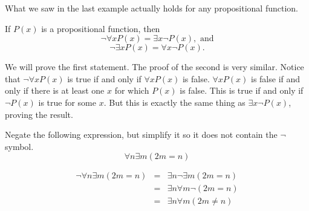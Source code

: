 What we saw in the last example actually holds for any propositional function. 
 
\begin{thm}
If $P(x)$ is a propositional function, then
$$\neg\forall x P(x) = \exists x \neg P(x), \mbox{ and}$$
$$\neg\exists x P(x) = \forall x \neg P(x).$$
\begin{pf}
We will prove the first statement.  The proof of the second is very similar.
Notice that $\neg\forall x P(x)$ is true if and only if $\forall x P(x)$ is false.
$\forall x P(x)$ is false if and only if there is at least one $x$ for which $P(x)$ is false.
This is true if and only if $\neg P(x)$ is true for some $x$.
But this is exactly the same thing as $\exists x \neg P(x)$, proving the result.
\end{pf}
\end{thm}



\begin{exa}\label{exa:allIntsEven}
Negate the following expression, but simplify it so it does not contain the $\neg$ symbol.
$$
\forall n \exists m (2m=n)
$$
\begin{sol}
\begin{eqnarray*}
\neg\forall n \exists m (2m=n)&=&\exists n \neg\exists m (2m=n)\\
&=&\exists n \forall m\neg (2m=n)\\
&=&\exists n \forall m (2m\neq n)\\
\end{eqnarray*}
\end{sol}
\end{exa}

